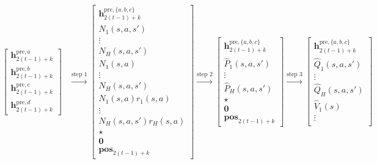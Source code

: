 \documentclass[10pt]{article}
\newcommand{\<}{\left\langle}
\renewcommand{\>}{\right\rangle}
\newcommand{\bzero}{{\mathbf 0}}
\newcommand{\pre}{{\mathrm{pre}}}
\newcommand{\posv}{{\mathbf{pos}}}
\newcommand{\parta}{{a}}
\newcommand{\partb}{{b}}
\newcommand{\partc}{{c}}
\newcommand{\partd}{{d}}
\newcommand{\state}{{s}}
\newcommand{\action}{{a}}
\newcommand{\reward}{{r}}
\newcommand{\horizon}{{H}}
\renewcommand{\horizon}{{H}}
\newcommand{\esttransit}{\widehat{P}}
\newcommand{\valuefun}{{V}}
\newcommand{\Numvi}{{N}}
\newcommand{\Qfun}{{Q}}
\newcommand{\estQfun}{{\widehat{\Qfun}}}
\newcommand{\Vfun}{{\valuefun}}
\newcommand{\estVfun}{{\widehat{\Vfun}}}
\def\bh{{\mathbf h}}
\begin{document}
\begin{align}
    \begin{bmatrix}
    \bh_{2(t-1)+k}^{\pre,\parta} \\  \bh_{2(t-1)+k}^{\pre,\partb}\\  \bh_{2(t-1)+k}^{\pre,\partc}\\   \bh_{2(t-1)+k}^{\pre,\partd}
\end{bmatrix}&
\xrightarrow{\text{step 1}}
   \begin{bmatrix}
    \bh_{2(t-1)+k}^{\pre,\{\parta,\partb,\partc\}} \\
        \Numvi_{1}(\state,\action,\state') \\ \vdots \\
         \Numvi_{\horizon}(\state,\action,\state') 
         \\ 
        \Numvi_{1}(\state,\action) \\\vdots\\
        \Numvi_{\horizon}(\state,\action,\state') 
         \\  
         \Numvi_{1}(\state,\action)\reward_{1}(\state,\action) \\\vdots\\
        \Numvi_{\horizon}(\state,\action,\state') \reward_{\horizon}(\state,\action)
         \\ 
         \star\\ \bzero \\\posv_{2(t-1)+k}
\end{bmatrix}
\xrightarrow{\text{step 2}}
\begin{bmatrix}
    \bh_{2(t-1)+k}^{\pre,\{\parta,\partb,\partc\}} \\
         \esttransit_{1}(\state,\action,\state') \\ \vdots \\
         \esttransit_{\horizon}(\state,\action,\state')  \\ \star
        \\ \bzero \\\posv_{2(t-1)+k}
\end{bmatrix}
\xrightarrow{\text{step 3}}
\begin{bmatrix}
    \bh_{2(t-1)+k}^{\pre,\{\parta,\partb,\partc\}} \\
         \estQfun_{1}(\state,\action,\state') \\ \vdots \\
         \estQfun_{\horizon}(\state,\action,\state')  \\ 
           \estVfun_{1}(\state) \\ \vdots \\

\end{bmatrix}
\end{align}
\end{document}
